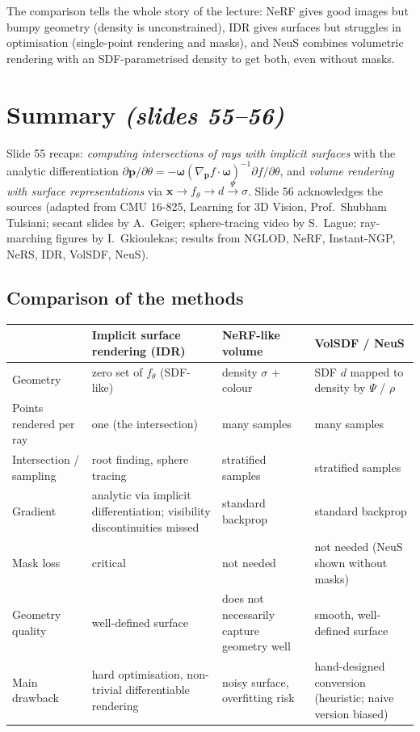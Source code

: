 \documentclass[11pt,a4paper]{article}
\newcommand{\bx}{{\bm{x}}}
\newcommand{\bp}{{\bm{p}}}
\newcommand{\bom}{{\bm{\omega}}}
\begin{document}
\begin{intuition}
The comparison tells the whole story of the lecture: NeRF gives good images but bumpy geometry (density is unconstrained),
IDR gives surfaces but struggles in optimisation (single-point rendering and masks), and NeuS combines volumetric rendering with
an SDF-parametrised density to get both, even without masks.
\end{intuition}

\section{Summary \emph{(slides 55--56)}}
Slide 55 recaps: \emph{computing intersections of rays with implicit surfaces} with the analytic differentiation
$\partial\bp/\partial\theta=-\bom(\nabla_{\bp} f\cdot\bom)^{-1}\partial f/\partial\theta$, and \emph{volume rendering with surface representations}
via $\bx\to f_\theta\to d\xrightarrow{\Psi}\sigma$. Slide 56 acknowledges the sources (adapted from CMU 16-825, Learning for 3D Vision, Prof.\ Shubham Tulsiani; secant slides by A.~Geiger;
sphere-tracing video by S.~Lague; ray-marching figures by I.~Gkioulekas; results from NGLOD, NeRF, Instant-NGP, NeRS, IDR, VolSDF, NeuS).

\subsection*{Comparison of the methods}
\begin{center}
\small
\renewcommand{\arraystretch}{1.25}
\begin{tabular}{@{}>{\raggedright\arraybackslash}p{2.7cm}>{\raggedright\arraybackslash}p{3.4cm}>{\raggedright\arraybackslash}p{3.3cm}>{\raggedright\arraybackslash}p{3.4cm}@{}}
\toprule
 & \textbf{Implicit surface rendering (IDR)} & \textbf{NeRF-like volume} & \textbf{VolSDF / NeuS}\\
\midrule
Geometry & zero set of $f_\theta$ (SDF-like) & density $\sigma$ + colour & SDF $d$ mapped to density by $\Psi$ / $\rho$\\
Points rendered per ray & one (the intersection) & many samples & many samples\\
Intersection / sampling & root finding, sphere tracing & stratified samples & stratified samples\\
Gradient & analytic via implicit differentiation; visibility discontinuities missed & standard backprop & standard backprop\\
Mask loss & critical & not needed & not needed (NeuS shown without masks)\\
Geometry quality & well-defined surface & does not necessarily capture geometry well & smooth, well-defined surface\\
Main drawback & hard optimisation, non-trivial differentiable rendering & noisy surface, overfitting risk & hand-designed conversion (heuristic; naive version biased)\\
\bottomrule
\end{tabular}
\end{center}
\end{document}
